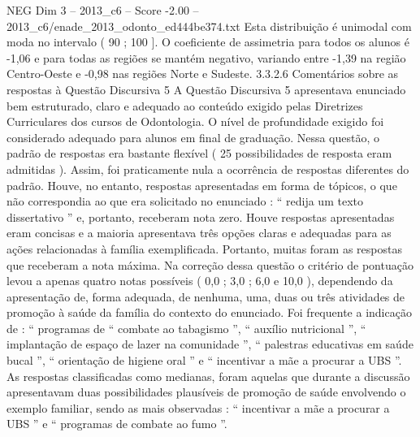 \begin{textsample}{NEG Dim 3 – 2013\_c6 – Score -2.00 – 2013\_c6/enade\_2013\_odonto\_ed444be374.txt}
Esta distribuição é unimodal com moda no intervalo ( 90 ; 100 ].
O coeficiente de assimetria para todos os alunos é -1,06 e para todas as regiões se mantém negativo, variando entre -1,39 na região Centro-Oeste e -0,98 nas regiões Norte e Sudeste. 3.3.2.6 Comentários sobre as respostas à Questão Discursiva 5 A Questão Discursiva 5 apresentava enunciado bem estruturado, claro e adequado ao conteúdo exigido pelas Diretrizes Curriculares dos cursos de Odontologia.
O nível de profundidade exigido foi considerado adequado para alunos em final de graduação.
Nessa questão, o padrão de respostas era bastante flexível ( 25 possibilidades de resposta eram admitidas ).
Assim, foi praticamente nula a ocorrência de respostas diferentes do padrão.
Houve, no entanto, respostas apresentadas em forma de tópicos, o que não correspondia ao que era solicitado no enunciado : “ redija um texto dissertativo ” e, portanto, receberam nota zero.
Houve respostas apresentadas eram concisas e a maioria apresentava três opções claras e adequadas para as ações relacionadas à família exemplificada.
Portanto, muitas foram as respostas que receberam a nota máxima.
Na correção dessa questão o critério de pontuação levou a apenas quatro notas possíveis ( 0,0 ; 3,0 ; 6,0 e 10,0 ), dependendo da apresentação de, forma adequada, de nenhuma, uma, duas ou três atividades de promoção à saúde da família do contexto do enunciado.
Foi frequente a indicação de : “ programas de “ combate ao tabagismo ”, “ auxílio nutricional ”, “ implantação de espaço de lazer na comunidade ”, “ palestras educativas em saúde bucal ”, “ orientação de higiene oral ” e “ incentivar a mãe a procurar a UBS ”.
As respostas classificadas como medianas, foram aquelas que durante a discussão apresentavam duas possibilidades plausíveis de promoção de saúde envolvendo o exemplo familiar, sendo as mais observadas : “ incentivar a mãe a procurar a UBS ” e “ programas de combate ao fumo ”.

\end{textsample}
